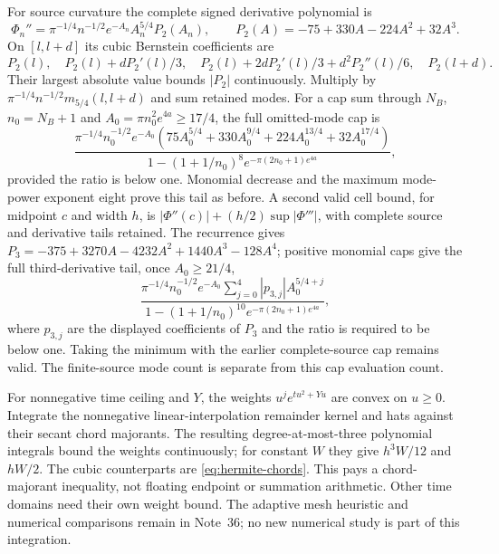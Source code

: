 For source curvature the complete signed derivative polynomial is
\begin{equation}
 \Phi_n''=\pi^{-1/4}n^{-1/2}e^{-A_n}A_n^{5/4}P_2(A_n),
 \qquad P_2(A)=-75+330A-224A^2+32A^3.
 \label{eq:signed-source-curvature}
\end{equation}
On $[l,l+d]$ its cubic Bernstein coefficients are
\[
 P_2(l),\quad P_2(l)+dP_2'(l)/3,\quad
 P_2(l)+2dP_2'(l)/3+d^2P_2''(l)/6,\quad P_2(l+d).
\]
Their largest absolute value bounds $|P_2|$ continuously. Multiply by
$\pi^{-1/4}n^{-1/2}m_{5/4}(l,l+d)$ and sum retained modes.
For a cap sum through $N_B$, $n_0=N_B+1$ and
$A_0=\pi n_0^2e^{4a}\ge17/4$, the full omitted-mode cap is
\begin{equation}
 \frac{\pi^{-1/4}n_0^{-1/2}e^{-A_0}
 (75A_0^{5/4}+330A_0^{9/4}+224A_0^{13/4}+32A_0^{17/4})}
 {1-(1+1/n_0)^8e^{-\pi(2n_0+1)e^{4a}}},
 \label{eq:signed-curvature-tail}
\end{equation}
provided the ratio is below one. Monomial decrease and the maximum
mode-power exponent eight prove this tail as before.
A second valid cell bound, for midpoint $c$ and width $h$, is
$|\Phi''(c)|+(h/2)\sup|\Phi'''|$, with complete source and derivative
tails retained. The recurrence gives
$P_3=-375+3270A-4232A^2+1440A^3-128A^4$; positive monomial caps
give the full third-derivative tail, once $A_0\ge21/4$,
\[
 \frac{\pi^{-1/4}n_0^{-1/2}e^{-A_0}
 \sum_{j=0}^4 |p_{3,j}|A_0^{5/4+j}}
 {1-(1+1/n_0)^{10}e^{-\pi(2n_0+1)e^{4a}}},
\]
where $p_{3,j}$ are the displayed coefficients of $P_3$ and the ratio
is required to be below one. Taking the minimum with the earlier complete-source
cap remains valid. The finite-source mode count is separate from this
cap evaluation count.

For nonnegative time ceiling and $Y$, the weights
$u^je^{tu^2+Yu}$ are convex on $u\ge0$. Integrate the nonnegative
linear-interpolation remainder kernel and hats against their secant
chord majorants. The resulting degree-at-most-three polynomial integrals
bound the weights continuously; for constant $W$ they give $h^3W/12$
and $hW/2$. The cubic counterparts are \eqref{eq:hermite-chords}.
This pays a chord-majorant inequality, not floating endpoint or summation
arithmetic. Other time domains need their own weight bound.
The adaptive mesh heuristic and numerical comparisons remain in Note~36;
no new numerical study is part of this integration.
